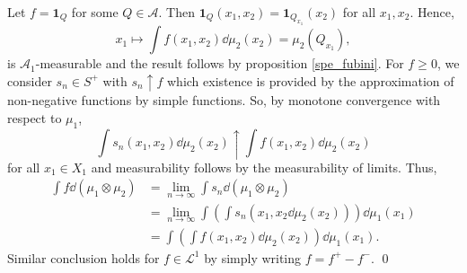 \documentclass[
]{article}
\theoremstyle{definition}
\theoremstyle{definition}
\begin{document}
Let \(f = \mathbf{1}_Q\) for some \(Q \in \mathcal{A}\). Then
\(\mathbf{1}_Q(x_1, x_2) = \mathbf{1}_{Q_{x_1}}(x_2)\) for all
\(x_1, x_2\). Hence,
\[x_1 \mapsto \int f(x_1, x_2) \dd\mu_2(x_2) = \mu_2(Q_{x_1}),\] is
\(\mathcal{A}_1\)-measurable and the result follows by proposition
\ref{spe_fubini}. For \(f \ge 0\), we consider \(s_n \in S^+\) with
\(s_n \uparrow f\) which existence is provided by the approximation of
non-negative functions by simple functions. So, by monotone convergence
with respect to \(\mu_1\),
\[\int s_n(x_1, x_2) \dd \mu_2(x_2) \uparrow \int f(x_1, x_2) \dd \mu_2(x_2)\]
for all \(x_1 \in X_1\) and measurability follows by the measurability
of limits. Thus, \[\begin{split}
    \int f \dd (\mu_1 \otimes \mu_2) & = \lim_{n \to \infty} \int s_n \dd (\mu_1 \otimes \mu_2)\\
      & = \lim_{n \to \infty} \int \left(\int s_n(x_1, x_2 \dd\mu_2(x_2)) \right) \dd \mu_1(x_1)\\
      & = \int\left(\int f(x_1, x_2) \dd\mu_2(x_2)\right)\dd \mu_1(x_1).
  \end{split}\] Similar conclusion holds for \(f \in \mathcal{L}^1\) by
simply writing \(f = f^+ - f^-\). \qed
\end{document}
